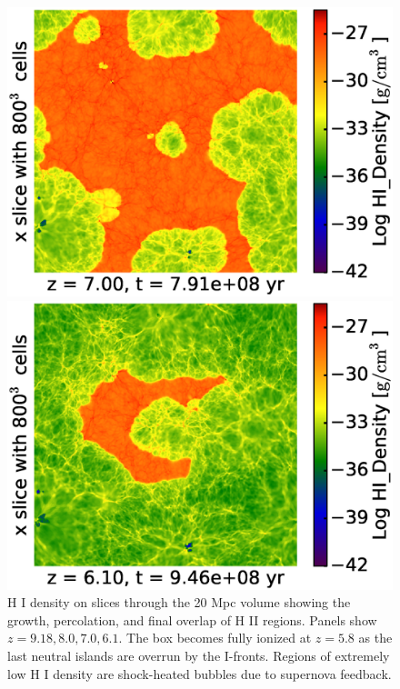 \begin{figure}[!tp]
\begin{minipage}[h]{0.5\linewidth}
        \centering
        \includegraphics[trim = 15mm 5mm 0mm 15mm, clip, width=1.0\textwidth]{2_1_slice_HI_Density_x_HD7900.eps}
    \end{minipage}
\hspace*{-4.00mm}
    \begin{minipage}[h]{0.5\linewidth}
        \centering
        \includegraphics[trim = 15mm 5mm 0mm 15mm, clip, width=1.0\textwidth]{2_2_slice_HI_Density_x_HD14475.eps}
    \end{minipage}
    \caption{H {\footnotesize I} density on slices through the 20 Mpc volume showing the growth, 
percolation, and final overlap of H II regions. Panels show $z=9.18, 8.0,
7.0, 6.1$. The box becomes fully ionized at $z=5.8$ as the last neutral islands
are overrun by the I-fronts. Regions of extremely low H {\footnotesize I} density are shock-heated 
bubbles due to supernova feedback.}
    \label{HI_slices}
\end{figure}

